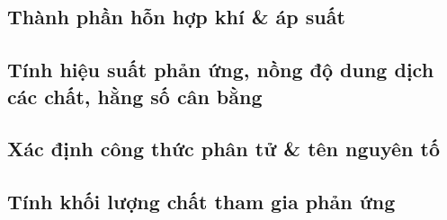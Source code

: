 \documentclass{article}
\numberwithin{equation}{section}
\begin{document}

\subsection{Thành phần hỗn hợp khí \& áp suất}


\subsection{Tính hiệu suất phản ứng, nồng độ dung dịch các chất, hằng số cân bằng}


\subsection{Xác định công thức phân tử \& tên nguyên tố}


\subsection{Tính khối lượng chất tham gia phản ứng}


\printbibliography[heading=bibintoc]
	
\end{document}
